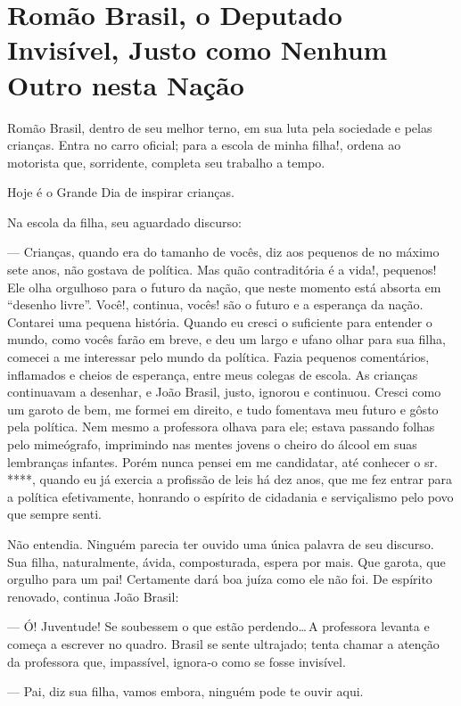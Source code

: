 \chapter{Romão Brasil, o Deputado Invisível, Justo como Nenhum Outro nesta Nação}

Romão Brasil, dentro de seu melhor terno, em sua luta pela sociedade e pelas crianças. Entra no carro oficial; para a escola de minha filha!, ordena ao motorista que, sorridente, completa seu trabalho a tempo.

Hoje é o Grande Dia de inspirar crianças.

Na escola da filha, seu aguardado discurso:

--- Crianças, quando era do tamanho de vocês, diz aos pequenos de no máximo sete anos, não gostava de política. Mas quão contraditória é a vida!, pequenos! Ele olha orgulhoso para o futuro da nação, que neste momento está absorta em ``desenho livre''. Você!, continua, vocês! são o futuro e a esperança da nação. Contarei uma pequena história. Quando eu cresci o suficiente para entender o mundo, como vocês farão em breve, e deu um largo e ufano olhar para sua filha, comecei a me interessar pelo mundo da política. Fazia pequenos comentários, inflamados e cheios de esperança, entre meus colegas de escola. As crianças continuavam a desenhar, e João Brasil, justo, ignorou e continuou. Cresci como um garoto de bem, me formei em direito, e tudo fomentava meu futuro e gôsto pela política. Nem mesmo a professora olhava para ele; estava passando folhas pelo mimeógrafo, imprimindo nas mentes jovens o cheiro do álcool em suas lembranças infantes. Porém nunca pensei em me candidatar, até conhecer o sr. ****, quando eu já exercia a profissão de leis há dez anos, que me fez entrar para a política efetivamente, honrando o espírito de cidadania e serviçalismo pelo povo que sempre senti.

Não entendia. Ninguém parecia ter ouvido uma única palavra de seu discurso. Sua filha, naturalmente, ávida, composturada, espera por mais. Que garota, que orgulho para um pai! Certamente dará boa juíza como ele não foi. De espírito renovado, continua João Brasil:

--- Ó! Juventude! Se soubessem o que estão perdendo\ldots\,A professora levanta e começa a escrever no quadro. Brasil se sente ultrajado; tenta chamar a atenção da professora que, impassível, ignora-o como se fosse invisível.

--- Pai, diz sua filha, vamos embora, ninguém pode te ouvir aqui.

